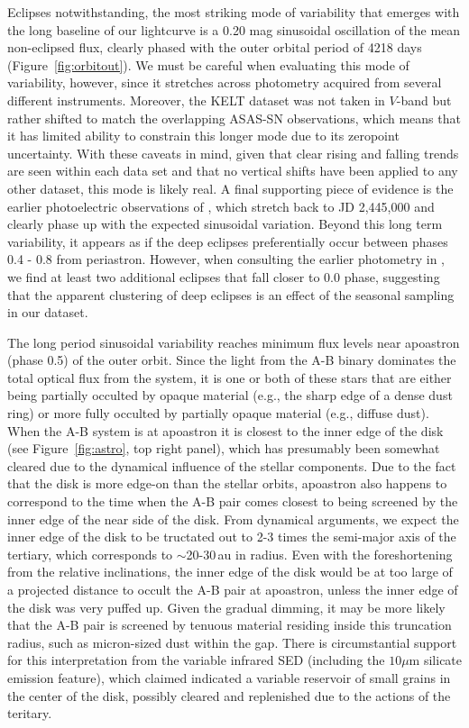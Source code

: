 \documentclass[twocolumn]{aastex61}
\begin{document}
Eclipses notwithstanding, the most striking mode of variability that emerges with the long baseline of our lightcurve is a 0.20 mag sinusoidal oscillation of the mean non-eclipsed flux, clearly phased with the outer orbital period of 4218 days (Figure~\ref{fig:orbitout}). We must be careful when evaluating this mode of variability, however, since it stretches across photometry acquired from several different instruments. Moreover, the KELT dataset was not taken in $V$-band but rather shifted to match the overlapping ASAS-SN observations, which means that it has limited ability to constrain this longer mode due to its zeropoint uncertainty. With these caveats in mind, given that clear rising and falling trends are seen within each data set and that no vertical shifts have been applied to any other dataset, this mode is likely real. A final supporting piece of evidence is the earlier photoelectric observations of \citet{shevchenko98}, which stretch back to JD 2,445,000 and clearly phase up with the expected sinusoidal variation.
Beyond this long term variability, it appears as if the deep eclipses preferentially occur between phases 0.4 - 0.8 from periastron. However, when consulting the earlier photometry in \citet{shevchenko98}, we find at least two additional eclipses that fall closer to 0.0 phase, suggesting that the apparent clustering of deep eclipses is an effect of the seasonal sampling in our dataset.

The long period sinusoidal variability reaches minimum flux levels near apoastron (phase 0.5) of the outer orbit. Since the light from the A-B binary dominates the total optical flux from the system, it is one or both of these stars that are either being partially occulted by opaque material (e.g., the sharp edge of a dense dust ring) or more fully occulted by partially opaque material (e.g., diffuse dust). When the A-B system is at apoastron it is closest to the inner edge of the disk (see Figure~\ref{fig:astro}, top right panel), which has presumably been somewhat cleared due to the dynamical influence of the stellar components. Due to the fact that the disk is more edge-on than the stellar orbits, apoastron also happens to correspond to the time when the A-B pair comes closest to being screened by the inner edge of the near side of the disk. From dynamical arguments, we expect the inner edge of the disk to be tructated out to 2-3 times the semi-major axis of the tertiary, which corresponds to $\sim$20-30\,au in radius. Even with the foreshortening from the relative inclinations, the inner edge of the disk would be at too large of a projected distance to occult the A-B pair at apoastron, unless the inner edge of the disk was very puffed up. Given the gradual dimming, it may be more likely that the A-B pair is screened by tenuous material residing inside this truncation radius, such as micron-sized dust within the gap. There is circumstantial support for this interpretation from the variable infrared SED (including the $10\mu$m silicate emission feature), which \citet{fang14} claimed indicated a variable reservoir of small grains in the center of the disk, possibly cleared and replenished due to the actions of the teritary.
\end{document}
